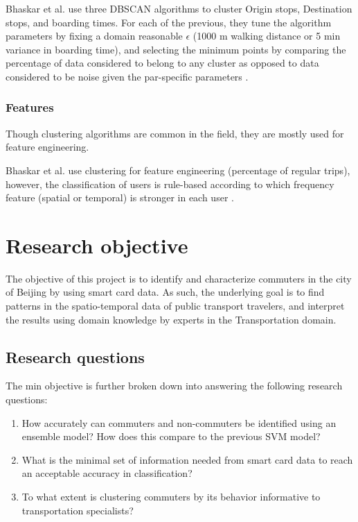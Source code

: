 \documentclass{article}
\begin{document}
\begin{description}
Bhaskar et al. use three DBSCAN algorithms to cluster Origin stops, Destination stops, and boarding times. For each of the previous, they tune the algorithm parameters by fixing a domain reasonable $\epsilon$ (1000 m walking distance or 5 min variance in boarding time), and selecting the minimum points by comparing the percentage of data considered to belong to any cluster as opposed to data considered to be noise given the par-specific parameters \cite{bhaskar2015passenger}. 


\end{description}

\subsubsection{Features}
Though clustering algorithms are common in the field, they are mostly used for feature engineering. 

Bhaskar et al. use clustering for feature engineering (percentage of regular trips), however, the classification of users is rule-based according to which frequency feature (spatial or temporal) is stronger in each user \cite{bhaskar2015passenger}.


\newpage
\section{Research objective}
The objective of this project is to identify and characterize commuters in the city of Beijing by using smart card data. As such, the underlying goal is to find patterns in the spatio-temporal data of public transport travelers, and interpret the results using domain knowledge by experts in the Transportation domain.  

\subsection{Research questions}
The min objective is further broken down into answering the following research questions: 

\begin{enumerate}
\item How accurately can commuters and non-commuters be identified using an ensemble model? How does this compare to the previous SVM model?
\item What is the minimal set of information needed from smart card data to reach an acceptable accuracy in classification?
\item To what extent is clustering commuters by its behavior informative to transportation specialists? 
\end{enumerate}
\end{document}
